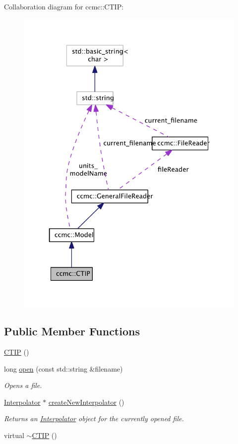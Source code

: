 Collaboration diagram for ccmc\-:\-:C\-T\-I\-P\-:\nopagebreak
\begin{figure}[H]
\begin{center}
\leavevmode
\includegraphics[width=325pt]{classccmc_1_1_c_t_i_p__coll__graph}
\end{center}
\end{figure}
\subsection*{Public Member Functions}
\begin{DoxyCompactItemize}
\item 
\hyperlink{classccmc_1_1_c_t_i_p_ad443922ade80ec2a2c170976299006c6}{C\-T\-I\-P} ()
\item 
long \hyperlink{classccmc_1_1_c_t_i_p_a2771b8d2ef4f22425f3e460ed5a9e671}{open} (const std\-::string \&filename)
\begin{DoxyCompactList}\small\item\em Opens a file.  \end{DoxyCompactList}\item 
\hyperlink{classccmc_1_1_interpolator}{Interpolator} $\ast$ \hyperlink{classccmc_1_1_c_t_i_p_a1efb34250bf5ef2eebac5ef68fe446f9}{create\-New\-Interpolator} ()
\begin{DoxyCompactList}\small\item\em Returns an \hyperlink{classccmc_1_1_interpolator}{Interpolator} object for the currently opened file.  \end{DoxyCompactList}\item 
virtual \hyperlink{classccmc_1_1_c_t_i_p_a74bd2c42b1dbe07e8ce1d2fcca5ada35}{$\sim$\-C\-T\-I\-P} ()
\end{DoxyCompactItemize}

